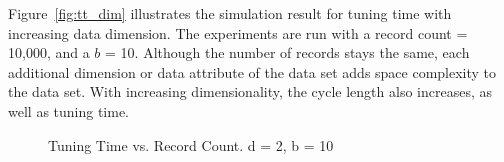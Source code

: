 Figure~\ref{fig:tt_dim} illustrates the simulation result for tuning time with increasing data dimension. The experiments are run with a record count = 10,000, and a $b$ = 10. Although the number of records stays the same, each additional dimension or data attribute of the data set adds space complexity to the data set. With increasing dimensionality, the cycle length also increases, as well as tuning time.

\begin{figure}[!h]
  \centering
  \caption{\small Tuning Time vs. Record Count. d = 2, b = 10}
  \label{fig:tt_rec}
\end{figure}

